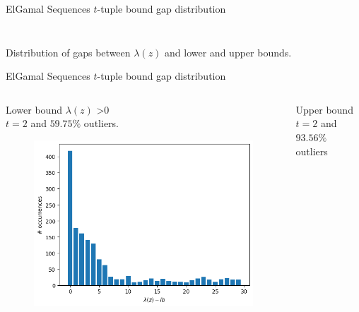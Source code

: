 \begin{frame}{ElGamal Sequences $t$-tuple bound gap distribution}
\begin{columns}
\begin{column}{0.45\textwidth}
\begin{figure}
            \end{figure}
        \end{column}
    \end{columns}
    \begin{center}
                Distribution of gaps between $\lambda(z)$ and lower and upper bounds.
    \end{center}
\end{frame}


\begin{frame}{ElGamal Sequences $t$-tuple bound gap distribution}
    \begin{columns}
        \begin{column}{0.45\textwidth}
        \begin{center}
            Lower bound $\lambda(z)$ >0\\
            $t =2$ and $59.75\%$ outliers.
        \end{center}
            \begin{figure}
                \centering
                \includegraphics[width=\textwidth]{figures/LB0t7with5975outliers.png}
            \end{figure}
        \end{column}
        \begin{column}{0.45\textwidth}
        \begin{center}
            Upper bound \\
            $t = 2$ and $93.56\%$ outliers
        \end{center}
            \begin{figure}

\end{figure}
\end{column}
\end{columns}
\end{frame}
